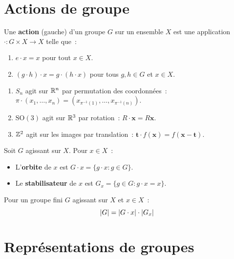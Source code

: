 \section{Actions de groupe}

\begin{definition}
Une \textbf{action} (gauche) d'un groupe $G$ sur un ensemble $X$ est une
application $\cdot: G \times X \to X$ telle que~:
\begin{enumerate}
    \item $e \cdot x = x$ pour tout $x \in X$.
    \item $(g \cdot h) \cdot x = g \cdot (h \cdot x)$ pour tous $g, h \in G$
          et $x \in X$.
\end{enumerate}
\end{definition}

\begin{exemple}
\begin{enumerate}
    \item $S_n$ agit sur $\mathbb{R}^n$ par permutation des coordonn\'ees~:
          $\pi \cdot (x_1, \ldots, x_n) = (x_{\pi^{-1}(1)}, \ldots, x_{\pi^{-1}(n)})$.
    \item $\mathrm{SO}(3)$ agit sur $\mathbb{R}^3$ par rotation~: $R \cdot \mathbf{x} = R\mathbf{x}$.
    \item $\mathbb{Z}^2$ agit sur les images par translation~: $\mathbf{t} \cdot f(\mathbf{x}) = f(\mathbf{x} - \mathbf{t})$.
\end{enumerate}
\end{exemple}

\begin{definition}
Soit $G$ agissant sur $X$. Pour $x \in X$~:
\begin{itemize}
    \item L'\textbf{orbite} de $x$ est $G \cdot x = \{g \cdot x : g \in G\}$.
    \item Le \textbf{stabilisateur} de $x$ est $G_x = \{g \in G : g \cdot x = x\}$.
\end{itemize}
\end{definition}

\begin{theoreme}
Pour un groupe fini $G$ agissant sur $X$ et $x \in X$~:
\[
    \left| G \right| = \left| G \cdot x \right| \cdot \left| G_x \right|
\]
\end{theoreme}

\section{Repr\'esentations de groupes}


